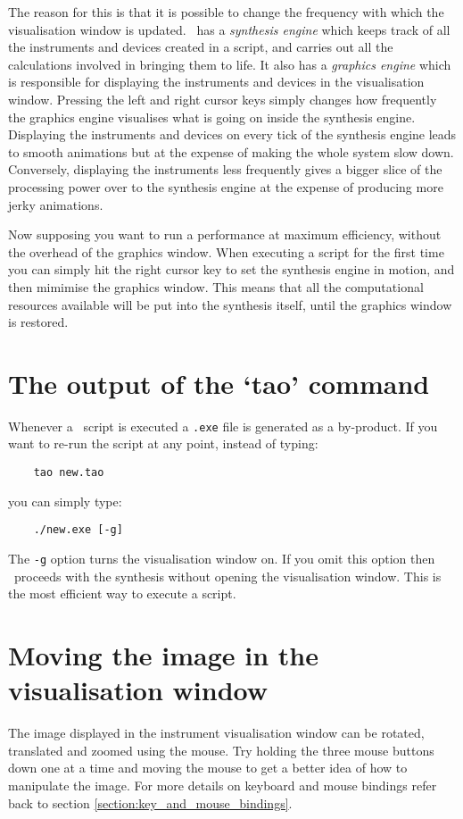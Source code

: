 The reason for this is that it is possible to change the frequency with
which the visualisation window is updated. \tao\ has a \emph{synthesis engine}
which keeps track of all the instruments and devices created in a script, and
carries out all the calculations involved in bringing them to life. It also
has a \emph{graphics engine} which is responsible for displaying the
instruments and devices in the visualisation window. Pressing the left and
right cursor keys simply changes how frequently the graphics engine 
visualises what is going on inside the synthesis engine. Displaying the
instruments and devices on every tick of the synthesis engine leads to
smooth animations but at the expense of making the whole system slow
down. Conversely, displaying the instruments less frequently gives
a bigger slice of the processing power over to the synthesis engine at the
expense of producing more jerky animations.

Now supposing you want to run a performance at maximum efficiency, without
the overhead of the graphics window. When executing a script for the
first time you can simply hit the right cursor key to set the synthesis
engine in motion, and then mimimise the graphics window. This means
that all the computational resources available will be put into the
synthesis itself, until the graphics window is restored.

\section{The output of the `tao' command}
Whenever a \tao\ script is executed a \verb|.exe| file is generated as a
by-product. If you want to re-run the script at any point, instead of typing:

\begin{verbatim}
    tao new.tao
\end{verbatim}

you can simply type:

\begin{verbatim}
    ./new.exe [-g]
\end{verbatim}

The \verb|-g| option turns the visualisation window on. If you omit
this option then \tao\ proceeds with the synthesis without opening
the visualisation window. This is the most efficient way to execute
a script.

\section{Moving the image in the visualisation window}
The image displayed in the instrument visualisation window can be
rotated, translated and zoomed using the mouse. Try holding the
three mouse buttons down one at a time and moving the mouse to get a
better idea of how to manipulate the image. For more details on
keyboard and mouse bindings refer back to section
\ref{section:key_and_mouse_bindings}.

